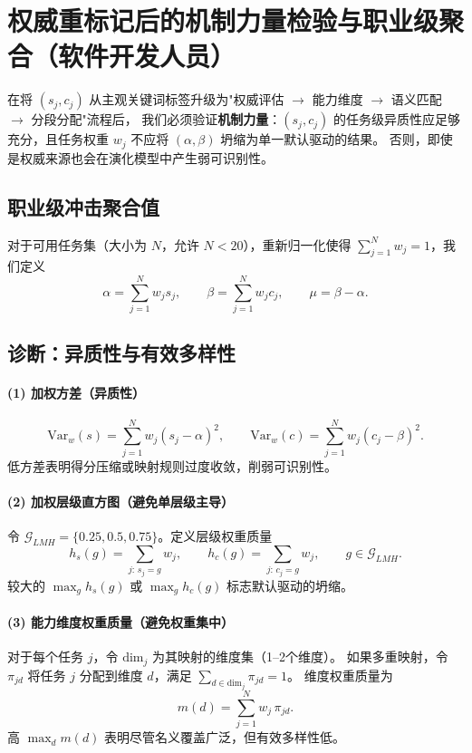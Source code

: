 \section{权威重标记后的机制力量检验与职业级聚合（软件开发人员）}

在将 $(s_j,c_j)$ 从主观关键词标签升级为"权威评估 $\rightarrow$ 能力维度 $\rightarrow$ 语义匹配 $\rightarrow$ 分段分配"流程后，
我们必须验证\textbf{机制力量}：$(s_j,c_j)$ 的任务级异质性应足够充分，且任务权重 $w_j$ 不应将 $(\alpha,\beta)$ 坍缩为单一默认驱动的结果。
否则，即使是权威来源也会在演化模型中产生弱可识别性。

\subsection{职业级冲击聚合值}

对于可用任务集（大小为 $N$，允许 $N<20$），重新归一化使得 $\sum_{j=1}^{N} w_j=1$，我们定义
\begin{equation}
    \alpha=\sum_{j=1}^{N} w_j s_j,\qquad
    \beta=\sum_{j=1}^{N} w_j c_j,\qquad
    \mu=\beta-\alpha.
\end{equation}

\subsection{诊断：异质性与有效多样性}

\paragraph{(1) 加权方差（异质性）}
\begin{equation}
    \mathrm{Var}_w(s)=\sum_{j=1}^{N} w_j (s_j-\alpha)^2,\qquad
    \mathrm{Var}_w(c)=\sum_{j=1}^{N} w_j (c_j-\beta)^2.
\end{equation}
低方差表明得分压缩或映射规则过度收敛，削弱可识别性。

\paragraph{(2) 加权层级直方图（避免单层级主导）}
令 $\mathcal{G}_{LMH}=\{0.25,0.5,0.75\}$。定义层级权重质量
\begin{equation}
    h_s(g)=\sum_{j:\,s_j=g} w_j,\qquad
    h_c(g)=\sum_{j:\,c_j=g} w_j,\qquad g\in\mathcal{G}_{LMH}.
\end{equation}
较大的 $\max_g h_s(g)$ 或 $\max_g h_c(g)$ 标志默认驱动的坍缩。

\paragraph{(3) 能力维度权重质量（避免权重集中）}
对于每个任务 $j$，令 $\mathrm{dim}_j$ 为其映射的维度集（1--2个维度）。
如果多重映射，令 $\pi_{j d}$ 将任务 $j$ 分配到维度 $d$，满足 $\sum_{d\in\mathrm{dim}_j}\pi_{j d}=1$。
维度权重质量为
\begin{equation}
    m(d)=\sum_{j=1}^{N} w_j\,\pi_{j d}.
\end{equation}
高 $\max_d m(d)$ 表明尽管名义覆盖广泛，但有效多样性低。

